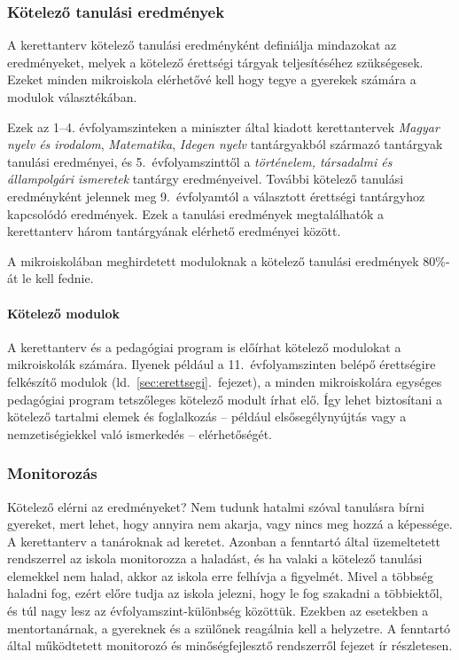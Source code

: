 \subsubsection{Kötelező tanulási eredmények}
\label{sec:kotelezo_tanulasi_eredmenyek}
A kerettanterv kötelező tanulási eredményként definiálja mindazokat az eredményeket, melyek a kötelező érettségi tárgyak teljesítéséhez szükségesek. Ezeket minden mikroiskola elérhetővé kell hogy tegye a gyerekek számára a modulok választékában.

Ezek az 1--4. évfolyamszinteken a miniszter által kiadott kerettantervek \emph{Magyar nyelv és irodalom}, \emph{Matematika}, \emph{Idegen nyelv} tantárgyakból származó tantárgyak tanulási eredményei, és 5.~évfolyamszinttől a \emph{történelem, társadalmi és állampolgári ismeretek} tantárgy eredményeivel. További kötelező tanulási eredményként jelennek meg 9.~évfolyamtól a választott érettségi tantárgyhoz kapcsolódó eredmények. Ezek a tanulási eredmények megtalálhatók a kerettanterv három tantárgyának elérhető eredményei között.

A mikroiskolában meghirdetett moduloknak a kötelező tanulási eredmények 80\%-át le kell fednie.

\paragraph{Kötelező modulok}
A kerettanterv és a pedagógiai program is előírhat kötelező modulokat a mikroiskolák számára. Ilyenek például a 11.~évfolyamszinten belépő érettségire felkészítő modulok (ld.~\ref{sec:erettsegi}.~fejezet), a minden mikroiskolára egységes pedagógiai program tetszőleges kötelező modult írhat elő. Így lehet biztosítani a kötelező tartalmi elemek és foglalkozás -- például elsősegélynyújtás vagy a nemzetiségiekkel való ismerkedés -- elérhetőségét.

\subsubsection{Monitorozás}

Kötelező elérni az eredményeket? Nem tudunk hatalmi szóval tanulásra bírni gyereket, mert lehet, hogy annyira nem akarja, vagy nincs meg hozzá a képessége. A kerettanterv a tanároknak ad keretet. Azonban a fenntartó által üzemeltetett rendszerrel az iskola  monitorozza a haladást, és ha valaki a kötelező tanulási elemekkel nem halad, akkor az iskola erre felhívja a figyelmét. Mivel a többség haladni fog, ezért előre tudja az iskola jelezni, hogy le fog szakadni a többiektől, és túl nagy lesz az évfolyamszint-különbség közöttük. Ezekben az esetekben a mentortanárnak, a gyereknek és a szülőnek reagálnia kell a helyzetre. A fenntartó által működtetett monitorozó és minőségfejlesztő rendszerről  fejezet ír részletesen.